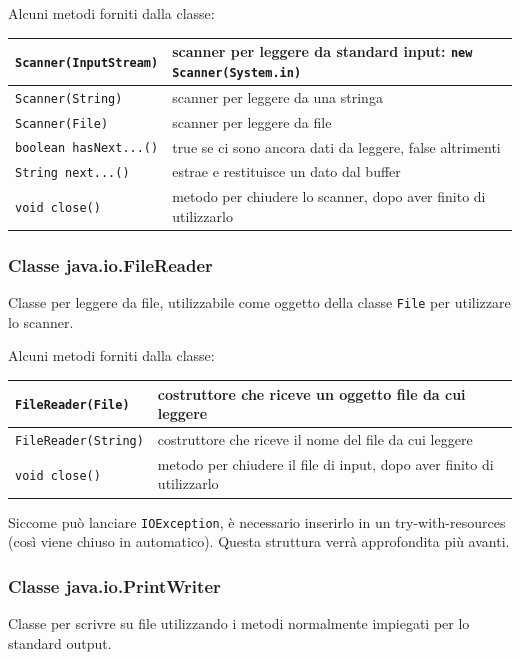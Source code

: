 \documentclass{article}
\begin{document}
Alcuni metodi forniti dalla classe:
\begin{center}
	\begin{tabularx}{\textwidth}{l X}
		\toprule
		\verb|Scanner(InputStream)| & scanner per leggere da standard input: \verb|new Scanner(System.in)| \\
		\midrule
		\verb|Scanner(String)| & scanner per leggere da una stringa \\
		\midrule
		\verb|Scanner(File)| & scanner per leggere da file \\
		\midrule
		\verb|boolean hasNext...()| & true se ci sono ancora dati da leggere, false altrimenti \\
		\midrule
		\verb|String next...()| & estrae e restituisce un dato dal buffer \\
		\midrule
		\verb|void close()| & metodo per chiudere lo scanner, dopo aver finito di utilizzarlo \\
		\bottomrule
	\end{tabularx}
\end{center}

\subsubsection*{Classe java.io.FileReader}
Classe per leggere da file, utilizzabile come oggetto della classe \verb|File| per utilizzare lo scanner.

Alcuni metodi forniti dalla classe:
\begin{center}
	\begin{tabularx}{\textwidth}{l X}
		\toprule
		\verb|FileReader(File)| & costruttore che riceve un oggetto file da cui leggere \\
		\midrule
		\verb|FileReader(String)| & costruttore che riceve il nome del file da cui leggere \\
		\midrule
		\verb|void close()| & metodo per chiudere il file di input, dopo aver finito di utilizzarlo \\
		\bottomrule
	\end{tabularx}
\end{center}

Siccome può lanciare \verb|IOException|, è necessario inserirlo in un try-with-resources (così viene chiuso in automatico).
Questa struttura verrà approfondita più avanti.

\newpage


\subsubsection*{Classe java.io.PrintWriter}
Classe per scrivre su file utilizzando i metodi normalmente impiegati per lo standard output.
\end{document}
